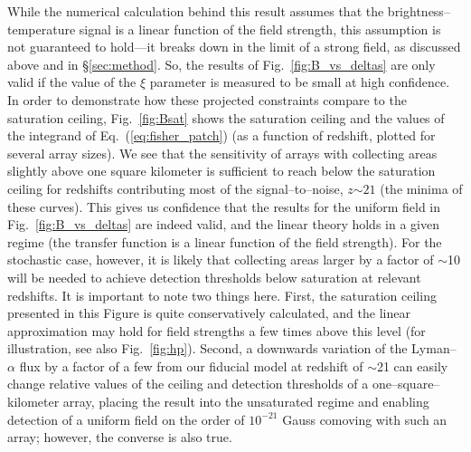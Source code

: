 \documentclass[aps,prd,twocolumn,floatfix,showpacs,superscriptaddress,nofootinbib]{revtex4-1}
\newcommand{\eq}[1]{{Eq.~(#1)}}
\begin{document}
While the numerical calculation behind this result assumes that the brightness--temperature signal is a linear function of the field strength, this assumption is not guaranteed to hold---it breaks down in the limit of a strong field, as discussed above and in \S\ref{sec:method}. So, the results of Fig.~\ref{fig:B_vs_deltas} are only valid if the value of the $\xi$ parameter is measured to be small at high confidence. In order to demonstrate how these projected constraints compare to the saturation ceiling, Fig.~\ref{fig:Bsat} shows the saturation ceiling and the values of the integrand of \eq{\ref{eq:fisher_patch}} (as a function of redshift, plotted for several array sizes). We see that the sensitivity of arrays with collecting areas slightly above one square kilometer is sufficient to reach below the saturation ceiling for redshifts contributing most of the signal--to--noise, $z$$\sim$$21$ (the minima of these curves). This gives us confidence that the results for the uniform field in Fig.~\ref{fig:B_vs_deltas} are indeed valid, and the linear theory holds in a given regime (the transfer function is a linear function of the field strength). For the stochastic case, however, it is likely that collecting areas larger by a factor of $\sim$10 will be needed to achieve detection thresholds below saturation at relevant redshifts. It is important to note two things here. First, the saturation ceiling presented in this Figure is quite conservatively calculated, and the linear approximation may hold for field strengths a few times above this level (for illustration, see also Fig.~\ref{fig:hp}). Second, a downwards variation of the Lyman--$\alpha$ flux by a factor of a few from our fiducial model at redshift of $\sim$21 can easily change relative values of the ceiling and detection thresholds of a one--square--kilometer array, placing the result into the unsaturated regime and enabling detection of a uniform field on the order of $10^{-21}$ Gauss comoving with such an array; however, the converse is also true. 
\end{document}
